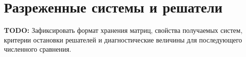 \section{Разреженные системы и решатели}
\label{sec:sparse-solvers}

\textbf{TODO:} Зафиксировать формат хранения матриц, свойства
получаемых систем, критерии остановки решателей и диагностические
величины для последующего численного сравнения.
